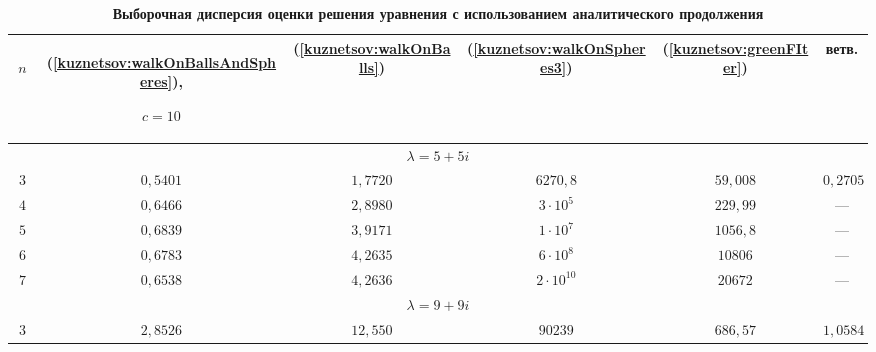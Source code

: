 \begin{table} \centering

    \begin{minipage}[t]{.5\textwidth} \centering

        \footnotesize

        \setlength{\tabcolsep}{1pt}

        \caption{\bf Выборочная дисперсия оценки решения уравнения с использованием аналитического продолжения}\label{kuznetsov:solDisp2}\vspace{-3mm}

    \begin{tabular}{c|c|c|c|c|c}

      \hline

      \, $n$&(\ref{kuznetsov:walkOnBallsAndSpheres}),

$c=10$&(\ref{kuznetsov:walkOnBalls})&(\ref{kuznetsov:walkOnSpheres3})&(\ref{kuznetsov:greenFIter})&ветв.\\

      \hline

      \multicolumn{6}{c}{$\lambda=5+5i$}\\

      \hline

      $3$&$0{,}5401$&$1{,}7720$&$6270{,}8$&$59{,}008$&$0{,}2705$\\

      \hline

      $4$&$0{,}6466$&$2{,}8980$&$3\cdot10^5$&$229{,}99$&---\\

      \hline

      $5$&$0{,}6839$&$3{,}9171$&$1\cdot10^7$&$1056{,}8$&---\\

      \hline

      $6$&$0{,}6783$&$4{,}2635$&$6\cdot10^8$&$10806$&---\\

      \hline

      $7$&$0{,}6538$&$4{,}2636$&$2\cdot10^{10}$&$20672$&---\\

      \hline

      \multicolumn{6}{c}{$\lambda=9+9i$}\\

      \hline

      $3$&$2{,}8526$&$12{,}550$&$90239$&$686{,}57$&$1{,}0584$\\


\end{tabular}
\end{minipage}
\end{table}
